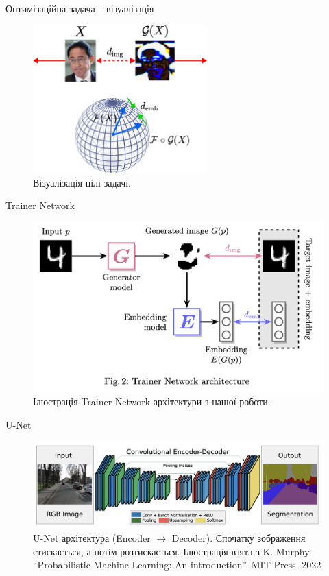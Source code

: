 \documentclass[xcolor={usenames,dvipsnames}]{beamer}
\begin{document}
    \begin{frame}{Оптимізаційна задача -- візуалізація}
        \begin{figure}
        \centering
            \includegraphics[width=0.6\textwidth]{images/idea_vis.png}
            \caption{Візуалізація цілі задачі.}
        \end{figure}
    \end{frame}

    \begin{frame}{Trainer Network}
        \begin{figure}
        \centering
            \includegraphics[width=\textwidth]{images/trainer.png}
            \caption{Ілюстрація Trainer Network архітектури з нашої роботи.}
        \end{figure}
    \end{frame}

    \begin{frame}{U-Net}
        \begin{figure}
        \centering
            \includegraphics[width=\textwidth]{images/unet.png}
            \caption{U-Net архітектура (Encoder $\to$ Decoder). Спочатку зображення стискається, а потім розтискається.
            \scriptsize Ілюстрація взята з K. Murphy ``Probabilistic Machine Learning: An introduction''. MIT Press. 2022}
        \end{figure}
    \end{frame}
\end{document}
